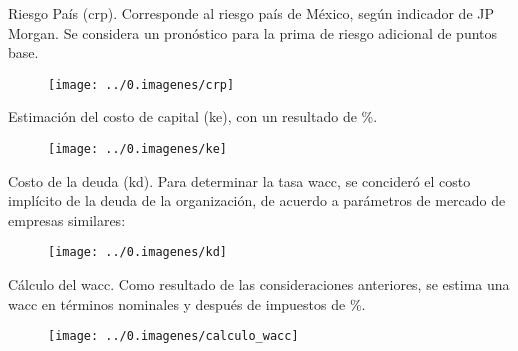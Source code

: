 \textcolor{principal}{Riesgo Pa\'is (\gls{crp}).} Corresponde al riesgo pa\'is de M\'exico, seg\'un indicador de JP Morgan. Se considera un pron\'ostico para la prima de riesgo adicional de \crpValor{} puntos base.

\begin{figure}[H]
\centering
\texttt{[image: ../0.imagenes/crp]}
\end{figure}

Estimaci\'on del costo de capital (\gls{ke}), con un resultado de \textcolor{principal}{\keValor\%.}

\begin{figure}[H]
\centering
\texttt{[image: ../0.imagenes/ke]}
\end{figure}

%
%
%

\textcolor{principal}{Costo de la deuda (\gls{kd}).} Para determinar la tasa \gls{wacc}, se concider\'o el costo impl\'icito de la deuda de la organizaci\'on, de acuerdo a par\'ametros de mercado de empresas similares:

\begin{figure}[H]
\centering
\texttt{[image: ../0.imagenes/kd]}
\end{figure}

\textcolor{principal}{C\'alculo del \gls{wacc}.} Como resultado de las consideraciones anteriores, se estima una \gls{wacc} en t\'erminos nominales y despu\'es de impuestos de \textcolor{principal}{\waccValor\%}.\\

\begin{figure}[H]
\centering
\texttt{[image: ../0.imagenes/calculo\_wacc]}
\end{figure}

